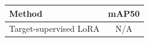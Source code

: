 \begin{tabular}{lc}
\toprule Method & mAP50 \\\midrule Target-supervised LoRA & N/A \\\bottomrule\end{tabular}
